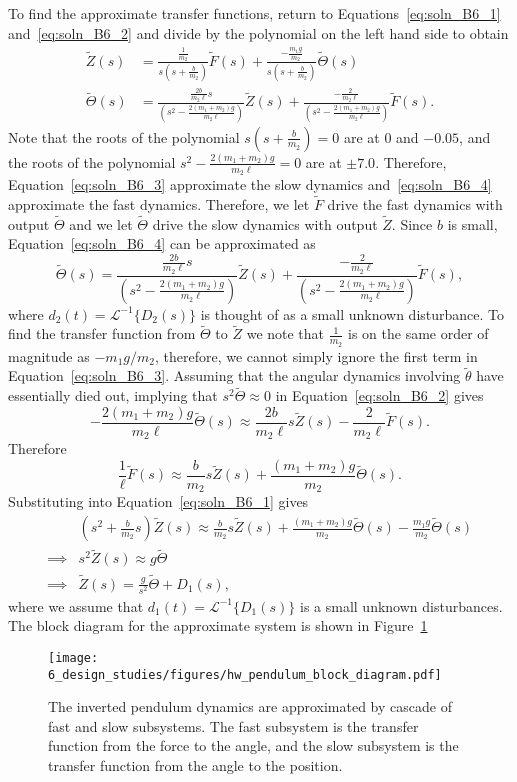 To find the approximate transfer functions, return to Equations~\eqref{eq:soln_B6_1} and~\eqref{eq:soln_B6_2} and divide by the polynomial on the left hand side to obtain
\begin{align}
\tilde{Z}(s) &=  \frac{\frac{1}{m_2}}{s(s + \frac{b}{m_2})} \tilde{F}(s) + \frac{-\frac{m_1g}{m_2}}{s(s + \frac{b}{m_2})}\tilde{\Theta}(s) 
\label{eq:soln_B6_3}\\
\tilde{\Theta}(s) &= \frac{\frac{2b}{m_2\ell}s}{(s^2 - \frac{2(m_1+m_2)g}{m_2\ell})}\tilde{Z}(s) + \frac{-\frac{2}{m_2\ell}}{(s^2 - \frac{2(m_1+m_2)g}{m_2\ell})}\tilde{F}(s).
\label{eq:soln_B6_4}
\end{align}
Note that the roots of the polynomial $s(s + \frac{b}{m_2})=0$ are at $0$ and $-0.05$, and the roots of the polynomial $s^2 - \frac{2(m_1+m_2)g}{m_2\ell}=0$ are at $\pm 7.0$.  Therefore, Equation~\eqref{eq:soln_B6_3} approximate the slow dynamics and~\eqref{eq:soln_B6_4} approximate the fast dynamics.  Therefore, we let $\tilde{F}$ drive the fast dynamics with output $\tilde{\Theta}$ and we let $\tilde{\Theta}$ drive the slow dynamics with output $\tilde{Z}$.
Since $b$ is small, Equation~\ref{eq:soln_B6_4} can be approximated as
\[
\tilde{\Theta}(s) = \frac{\frac{2b}{m_2\ell}s}{(s^2 - \frac{2(m_1+m_2)g}{m_2\ell})}\tilde{Z}(s) + \frac{-\frac{2}{m_2\ell}}{(s^2 - \frac{2(m_1+m_2)g}{m_2\ell})}\tilde{F}(s),
\]
where $d_2(t)=\mathcal{L}^{-1}\{D_2(s)\}$ is thought of as a small unknown disturbance.  
To find the transfer function from $\tilde{\Theta}$ to $\tilde{Z}$ we note that $\frac{1}{m_2}$ is on the same order of magnitude as $-m_1 g/m_2$, therefore, we cannot simply ignore the first term in Equation~\eqref{eq:soln_B6_3}.  Assuming that the angular dynamics involving $\tilde{\theta}$ have essentially died out, implying that $s^2\tilde{\Theta}\approx 0$ in Equation~\eqref{eq:soln_B6_2} gives
\[
-\frac{2(m_1+m_2)g}{m_2\ell}\tilde{\Theta}(s) \approx \frac{2b}{m_2\ell}s\tilde{Z}(s)-\frac{2}{m_2\ell}\tilde{F}(s).
\]
Therefore
\[
\frac{1}{\ell}\tilde{F}(s) \approx \frac{b}{m_2}s\tilde{Z}(s)
+ \frac{(m_1+m_2)g}{m_2}\tilde{\Theta}(s).
\]
Substituting into Equation~\eqref{eq:soln_B6_1} gives
\begin{align*}
& (s^2 + \frac{b}{m_2}s)\tilde{Z}(s) \approx  
	\frac{b}{m_2}s\tilde{Z}(s)
	+ \frac{(m_1+m_2)g}{m_2}\tilde{\Theta}(s) 
	- \frac{m_1g}{m_2}\tilde{\Theta}(s) \\
\implies & s^2 \tilde{Z}(s) \approx g\tilde{\Theta} \\
\implies & \tilde{Z}(s) = \frac{g}{s^2}\tilde{\Theta} + D_1(s),
\end{align*}
where we assume that $d_1(t)=\mathcal{L}^{-1}\{D_1(s)\}$ is a small unknown disturbances.
The block diagram for the approximate system is shown in Figure~\ref{fig:dm_soln_b6}
\begin{figure}[htbp]
   \centering
   \texttt{[image: 6\_design\_studies/figures/hw\_pendulum\_block\_diagram.pdf]}
   \caption{The inverted pendulum dynamics are approximated by cascade of fast and slow subsystems.  The fast subsystem is the transfer function from the force to the angle, and the slow subsystem is the transfer function from the angle to the position.}
   \label{fig:dm_soln_b6}
\end{figure}

